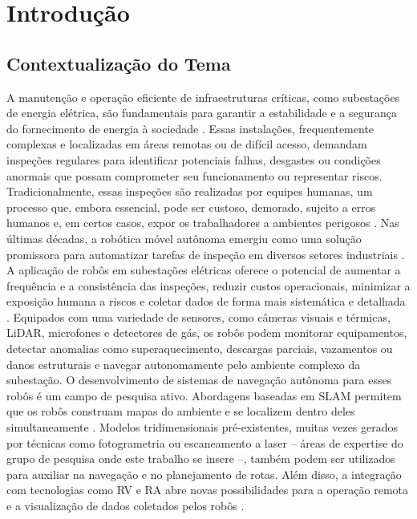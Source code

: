 \chapter[Introdução]{Introdução}

\section{Contextualização do Tema}
A manutenção e operação eficiente de infraestruturas críticas, como subestações de energia elétrica, são fundamentais para garantir a estabilidade e a segurança do fornecimento de energia à sociedade \cite{suitelec2023}. Essas instalações, frequentemente complexas e localizadas em áreas remotas ou de difícil acesso, demandam inspeções regulares para identificar potenciais falhas, desgastes ou condições anormais que possam comprometer seu funcionamento ou representar riscos. Tradicionalmente, essas inspeções são realizadas por equipes humanas, um processo que, embora essencial, pode ser custoso, demorado, sujeito a erros humanos e, em certos casos, expor os trabalhadores a ambientes perigosos \cite{Li2025SafetyRisk}.
Nas últimas décadas, a robótica móvel autônoma emergiu como uma solução promissora para automatizar tarefas de inspeção em diversos setores industriais \cite{Wang2024Advancements}. A aplicação de robôs em subestações elétricas oferece o potencial de aumentar a frequência e a consistência das inspeções, reduzir custos operacionais, minimizar a exposição humana a riscos e coletar dados de forma mais sistemática e detalhada \cite{RobotnikSubstationBenefits}. Equipados com uma variedade de sensores, como câmeras visuais e térmicas, \ac{LiDAR}, microfones e detectores de gás, os robôs podem monitorar equipamentos, detectar anomalias como superaquecimento, descargas parciais, vazamentos ou danos estruturais e navegar autonomamente pelo ambiente complexo da subestação.
O desenvolvimento de sistemas de navegação autônoma para esses robôs é um campo de pesquisa ativo. Abordagens baseadas em \ac{SLAM} permitem que os robôs construam mapas do ambiente e se localizem dentro deles simultaneamente \cite{Bosche2018SLAM}. Modelos tridimensionais pré-existentes, muitas vezes gerados por técnicas como fotogrametria ou escaneamento a laser – áreas de expertise do grupo de pesquisa onde este trabalho se insere –, também podem ser utilizados para auxiliar na navegação e no planejamento de rotas. Além disso, a integração com tecnologias como \ac{RV} e \ac{RA} abre novas possibilidades para a operação remota e a visualização de dados coletados pelos robôs \cite{Zhang2023ARVR}.
